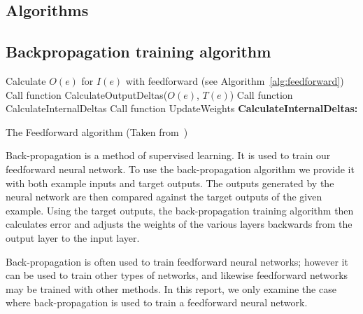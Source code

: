 \documentclass[11pt]{article}
\begin{document}

\subsection{Algorithms} %
\label{sub:algorithms}

\subsection{Backpropagation training algorithm} %
\label{sub:backpropagation_training_algorithm}

\begin{algorithm}%
\SetLine
{}
{
	Calculate $O(e)$ for $I(e)$ with feedforward (see Algorithm~\ref{alg:feedforward})\;
	Call function CalculateOutputDeltas($O(e)$, $T(e)$)\;
	Call function CalculateInternalDeltas\;
	Call function UpdateWeights\;
}
\textbf{CalculateInternalDeltas:}

\caption{The Feedforward algorithm (Taken from~\cite{skapura})}
\label{alg:feedforward}
\end{algorithm}

Back-propagation is a method of supervised learning. It is used to train our feedforward neural network. To use the back-propagation
algorithm we provide it with both example inputs and target outputs. The outputs generated by the neural network are then compared
against the target outputs of the given example. Using the target outputs, the back-propagation training algorithm then calculates error
and adjusts the weights of the various layers backwards from the output layer to the input layer.

Back-propagation is often used to train feedforward neural networks; however it can be used to train other types of networks, and
likewise feedforward networks may be trained with other methods. In this report, we only examine the case where back-propagation is used to train a feedforward neural network.


\end{document}
